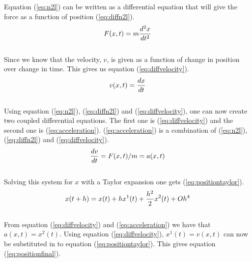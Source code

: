 \documentclass{article}
\begin{document}
    Equation (\ref{eq:n2l}) can be written as a differential equation that will give the force as a function of position (\ref{eq:diffn2l}).\\

    \begin{equation}    \label{eq:diffn2l}
        F(x,t) = m\frac{d^{2}x}{dt^{2}}\\
    \end{equation} \\

    Since we know that the velocity, $v$, is given as a function of change in position over change in time. This gives us equation (\ref{eq:diffvelocity}).\\

    \begin{equation}    \label{eq:diffvelocity}
        v(x,t) = \frac{dx}{dt} \\
    \end{equation} \\

    Using equation (\ref{eq:n2l}), (\ref{eq:diffn2l}) and (\ref{eq:diffvelocity}), one can now create two coupled differential equations. The first one is (\ref{eq:diffvelocity}) and the second one is (\ref{eq:acceleration}). (\ref{eq:acceleration}) is a combination of (\ref{eq:n2l}), (\ref{eq:diffn2l}) and (\ref{eq:diffvelocity}). \\

    \begin{equation}    \label{eq:acceleration}
        \frac{dv}{dt} = F(x,t)/m = a(x,t) \\
    \end{equation} \\

    Solving this system for $x$ with a Taylor expansion one gets (\ref{eq:positiontaylor}).\\

    \begin{equation}    \label{eq:positiontaylor}
        x(t+h) = x(t) + hx^{1}(t) + \frac{h^{2}}{2} x^{2}(t) + Oh^{4} \\
    \end{equation} \\

    From equation (\ref{eq:diffvelocity}) and (\ref{eq:acceleration}) we have that $a(x,t) = x^{2}(t)$. Using equation (\ref{eq:diffvelocity}), $x^{1}(t) = v(x,t)$ can now be substituted in to equation (\ref{eq:positiontaylor}). This gives equation (\ref{eq:positionfinal}).  \\
\end{document}
